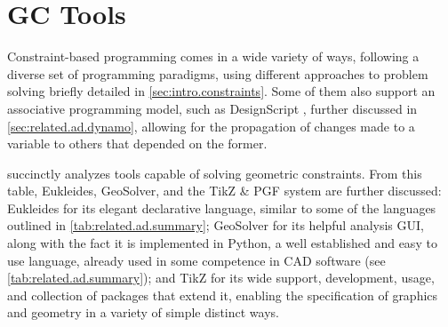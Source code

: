 \section{\acl{GC} Tools}
\label{sec:related.constraints}

Constraint-based programming comes in a wide variety of ways, following a
diverse set of programming paradigms, using different approaches to problem
solving briefly detailed in \cref{sec:intro.constraints}.  Some of them also
support an associative programming model, such as DesignScript
\cite{Aish:2011:DesignScript}, further discussed in
\cref{sec:related.ad.dynamo}, allowing for the propagation of changes made to a
variable to others that depended on the former.

 succinctly analyzes tools capable of
solving geometric constraints.  From this table, Eukleides, GeoSolver, and the
\acs{TikZ} \& \acs{PGF} system are further discussed: Eukleides for its elegant
declarative language, similar to some of the languages outlined in
\cref{tab:related.ad.summary}; GeoSolver for its helpful analysis \ac{GUI},
along with the fact it is implemented in Python, a well established and easy to
use language, already used in some competence in \ac{CAD} software (see
\cref{tab:related.ad.summary}); and \acs{TikZ} for its wide support,
development, usage, and collection of packages that extend it, enabling the
specification of graphics and geometry in a variety of simple distinct ways.

